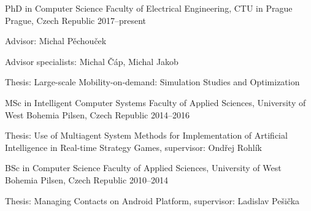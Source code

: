 

\begin{cventries}

  \cventry
    {PhD in Computer Science} %
    {Faculty of Electrical Engineering, CTU in Prague} %
    {Prague, Czech Republic} %
    {2017--present} %
    {
      \begin{cvitems} %
        \item {Advisor: Michal Pěchouček}
        \item {Advisor specialists: Michal Čáp, Michal Jakob}
        \item {Thesis: Large-scale Mobility-on-demand: Simulation Studies and Optimization}
      \end{cvitems}
    }

  \cventry
    {MSc in Intelligent Computer Systems} %
    {Faculty of Applied Sciences, University of West Bohemia} %
    {Pilsen, Czech Republic} %
    {2014--2016} %
    {
      \begin{cvitems} %
        \item {Thesis: Use of Multiagent System Methods for Implementation of Artificial Intelligence in Real-time Strategy Games, supervisor:  Ondřej Rohlík}
      \end{cvitems}
    }

  \cventry
    {BSc in Computer Science} %
    {Faculty of Applied Sciences, University of West Bohemia} %
    {Pilsen, Czech Republic} %
    {2010--2014} %
    {
      \begin{cvitems} %
        \item {Thesis: Managing Contacts on Android Platform, supervisor: Ladislav Pešička}
      \end{cvitems}
    }

\end{cventries}
